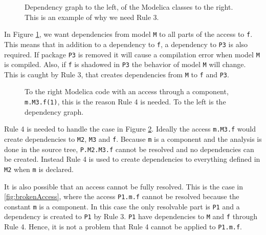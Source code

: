 \documentclass{cslthse-msc}
\begin{document}
\begin{figure}[!htbp]
    \centering
    \qquad
    \caption{Dependency graph to the left, of the Modelica classes to the right. This is an example of why we need Rule 3.}
    \label{fig:dotAccess}
\end{figure}

In Figure \ref{fig:dotAccess}, we want dependencies from model \texttt{M} to all parts of the access to \texttt{f}. This means that in addition to a dependency to \texttt{f}, a dependency to \texttt{P3} is also required. If package \texttt{P3} is removed it will cause a compilation error when model \texttt{M} is compiled. Also, if \texttt{f} is shadowed in \texttt{P3} the behavior of model \texttt{M} will change. This is caught by Rule 3, that creates dependencies from \texttt{M} to \texttt{f} and \texttt{P3}.


\begin{figure}[!htbp]
    \centering
    \qquad
    \subfloat{\raisebox{4.7 cm}{}}
    \caption{To the right Modelica code with an access through a component, \texttt{m.M3.f(1)}, this is the reason Rule 4 is needed. To the left is the dependency graph.}
    \label{fig:component}
\end{figure}

Rule 4 is needed to handle the case in Figure \ref{fig:component}. Ideally the access \texttt{m.M3.f} would create dependencies to \texttt{M2}, \texttt{M3} and \texttt{f}. Because \texttt{m} is a component and the analysis is done in the source tree, \texttt{P.M2.M3.f} cannot be resolved and no dependencies can be created. Instead Rule 4 is used to create dependencies to everything defined in \texttt{M2} when \texttt{m} is declared.

It is also possible that an access cannot be fully resolved. This is the case in \ref{fig:brokenAccess}, where the access \texttt{P1.m.f} cannot be resolved because the constant \texttt{m} is a component. In this case the only resolvable part is \texttt{P1} and a  dependency is created to \texttt{P1} by Rule 3. \texttt{P1} have dependencies to \texttt{M} and \texttt{f} through Rule 4. Hence, it is not a problem that Rule 4 cannot be applied to \texttt{P1.m.f}.
\end{document}
